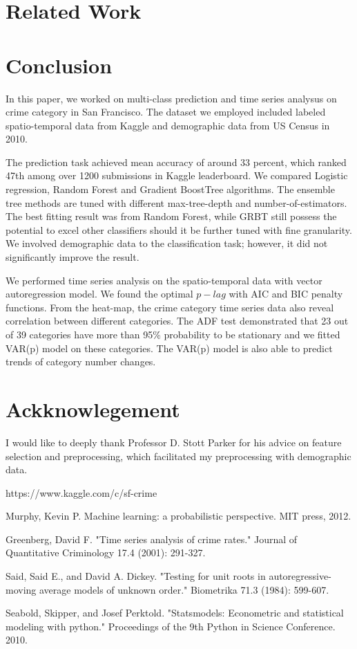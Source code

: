 \documentclass[11pt,conference]{IEEEtran}
\begin{document}
\section{Related Work}

\section{Conclusion}
In this paper, we worked on multi-class prediction and time series analysus on crime category in San Francisco. The dataset we employed included labeled spatio-temporal data from Kaggle and demographic data from US Census in 2010.

The prediction task achieved mean accuracy of around 33 percent, which ranked 47th among over 1200 submissions in Kaggle leaderboard. We compared Logistic regression, Random Forest and Gradient BoostTree algorithms. The ensemble tree methods are tuned with different max-tree-depth and number-of-estimators. The best fitting result was from Random Forest, while GRBT still possess the potential to excel other classifiers should it be further tuned with fine granularity. We involved demographic data to the classification task; however, it did not significantly improve the result.

We performed time series analysis on the spatio-temporal data with vector autoregression model. We found the optimal $p-lag$ with AIC and BIC penalty functions. From the heat-map, the crime category time series data also reveal correlation between different categories. The ADF test demonstrated that 23 out of 39 categories have more than 95\% probability to be stationary and we fitted VAR(p) model on these categories. The VAR(p) model is also able to predict trends of category number changes.

\section{Ackknowlegement}
I would like to deeply thank Professor D. Stott Parker for his advice on feature selection and preprocessing, which facilitated my preprocessing with demographic data.\\


\begin{thebibliography}{1}

https://www.kaggle.com/c/sf-crime

Murphy, Kevin P. Machine learning: a probabilistic perspective. MIT press, 2012.

Greenberg, David F. "Time series analysis of crime rates." Journal of Quantitative Criminology 17.4 (2001): 291-327.

Said, Said E., and David A. Dickey. "Testing for unit roots in autoregressive-moving average models of unknown order." Biometrika 71.3 (1984): 599-607.

Seabold, Skipper, and Josef Perktold. "Statsmodels: Econometric and statistical modeling with python." Proceedings of the 9th Python in Science Conference. 2010.

\end{thebibliography}
\end{document}
